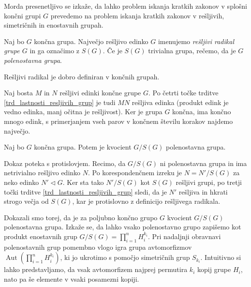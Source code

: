  Morda presenetljivo se izkaže, da lahko problem iskanja kratkih zakonov v splošni končni grupi $G$ prevedemo na problem iskanja kratkih zakonov v rešljivih, simetričnih in enostavnih grupah.

\begin{definicija}
\label{def_resljiv_radikal}
Naj bo $G$ končna grupa. Največjo rešljivo edinko $G$ imenujemo \emph{rešljivi radikal grupe $G$} in ga označimo z $S(G)$. Če je $S(G)$ trivialna grupa, rečemo, da je $G$ \emph{polenostavna grupa}.
\end{definicija}
\begin{lema}
\label{lem_dobra_definiranost_resljivega_radikala}
Rešljivi radikal je dobro definiran v končnih grupah.
\end{lema}
\begin{dokaz}
    Naj bosta $M$ in $N$ rešljivi edinki končne grupe $G$. Po četrti točke trditve \ref{trd_lastnosti_resljivih_grup} je tudi $MN$ rešljiva edinka (produkt edink je vedno edinka, manj očitna je rešljivost). Ker je grupa $G$ končna, ima končno mnogo edink,
    s primerjanjem vseh parov v končnem številu korakov najdemo največjo. 
\end{dokaz}

\begin{lema}
\label{lem_kvoocient_resljivega_radikala_je_polenostaven}
Naj bo $G$ končna grupa. Potem je kvocient $G / S(G)$ polenostavna grupa. 
\end{lema}
\begin{dokaz}
    Dokaz poteka s protislovjem. Recimo, da $G / S(G)$ ni polenostavna grupa in ima netrivialno rešljivo edinko $N$. Po korespondenčnem izreku je $N = N' / S(G)$ za neko edinko $N' \triangleleft G$.
    Ker sta tako $N' / S(G)$ kot $S(G)$ rešljivi grupi, po tretji točki trditve \ref{trd_lastnosti_resljivih_grup} sledi, da je $N'$ rešljiva in hkrati strogo večja od $S(G)$, kar je protislovno z definicijo rešljivega radikala.
\end{dokaz}

Dokazali smo torej, da je za poljubno končno grupo $G$ kvocient $G / S(G)$ polenostavna grupa. Izkaže se, da lahko vsako polenostavno grupo zapišemo kot produkt enostavnih grup $G / S(G) = \prod_{i = 1}^{n} H_i^{k_i}$. Pri nadaljnji obravnavi polenostavnih grup pomembno vlogo igra grupa avtomorfizmov $\operatorname{Aut}\left(  \prod_{i = 1}^{n} H_i^{k_i} \right)$, ki jo ukrotimo s pomočjo simetričnih grup $S_{k_i}$. Intuitivno si lahko predstavljamo, da vsak avtomorfizem najprej permutira $k_i$ kopij grupe $H_i$, nato pa še elemente v vsaki posamezni kopiji.
 
